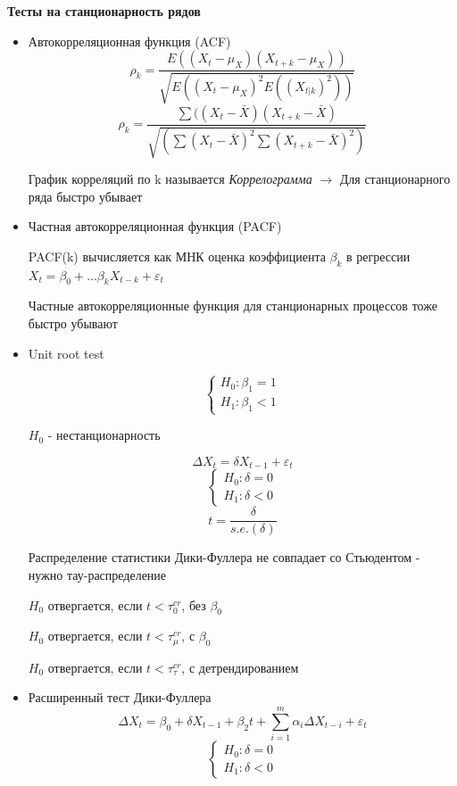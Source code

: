\documentclass[a4paper, 12pt]{article}
\begin{document}
\textbf{Тесты на станционарность рядов}
\begin{itemize}
    \item Автокорреляционная функция (ACF)
    \[\rho_{k} = \frac{E((X_{t} - \mu_{X})(X_{t + k} - \mu_{X}))}{\sqrt{E((X_{t} - \mu_{X})^{2}E((X_{t|k})^{2}))}}
    \]
    \[\rho_{k} = \frac{\sum((X_{t} - \bar{X})(X_{t + k} - \bar{X})}{\sqrt{(\sum(X_{t} - \bar{X})^{2}\sum(X_{t+k} - \bar{X})^{2})}}\]
    
    График корреляций по k называется \textit{Коррелограмма} $\rightarrow$ Для станционарного ряда быстро убывает
    \item Частная автокорреляционная функция (PACF)
    
    PACF(k) вычисляется как МНК оценка коэффициента $\beta_{k}$ в регрессии $X_{t} = \beta_{0} + ... \beta_{k}X_{t - k} + \varepsilon_{t}$
    
    Частные автокорреляционные функция для станционарных процессов тоже быстро убывают
    \item Unit root test
    
    \[\begin{cases}H_{0}: \beta_{1} = 1 \\ H_{1}: \beta_{1} < 1\end{cases}\]
    
    $H_{0}$ - нестанционарность
    
    \[\Delta X_{t} = \delta X_{t - 1} + \varepsilon_{t}\]
    \[\begin{cases}H_{0}: \delta = 0 \\ H_{1}: \delta < 0\end{cases}\]
    \[t = \frac{\delta}{s.e.(\delta)}\]
    
    Распределение статистики Дики-Фуллера не совпадает со Стьюдентом - нужно тау-распределение
    
    $H_{0}$ отвергается, если $t < \tau_{0}^{cr}$, без $\beta_{0}$
    
    $H_{0}$ отвергается, если $t < \tau_{\mu}^{cr}$, с $\beta_{0}$
    
    $H_{0}$ отвергается, если $t < \tau_{\tau}^{cr}$, с детрендированием
    
    \item Расширенный тест Дики-Фуллера
    \[\Delta X_{t} = \beta_{0} + \delta X_{t-1} + \beta_{2}t + \sum_{i  = 1}^{m}\alpha_{i}\Delta X_{t - i} + \varepsilon_{t}\]
    \[\begin{cases}
        H_{0}: \delta = 0 \\
        H_{1}: \delta < 0
    \end{cases}\]
    

\end{itemize}
\end{document}
